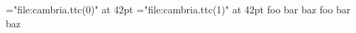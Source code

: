\ifdefined\directlua\fi
\font\subfontone="file:cambria.ttc(0)" at 42pt
\font\subfonttwo="file:cambria.ttc(1)" at 42pt
\subfontone foo bar baz \endgraf
\subfonttwo foo bar baz \endgraf
\bye
